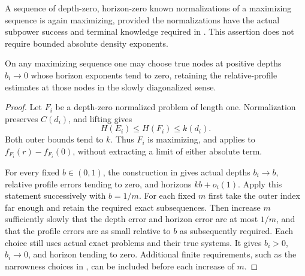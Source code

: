 \begin{corollary}
\label{a03:zero-depth}
A sequence of depth-zero, horizon-zero known normalizations of a
maximizing sequence is again maximizing, provided the normalizations
have the actual subpower success and terminal knowledge required in
.  This assertion does not require bounded
absolute density exponents.

On any maximizing sequence one may choose true nodes at positive depths
\(b_i\to0\) whose horizon exponents tend to zero, retaining the
relative-profile estimates at those nodes in the slowly diagonalized
sense.
\end{corollary}
\begin{proof}
Let \(F_i\) be a depth-zero normalized problem of length one.
Normalization preserves \(C(d_i)\), and lifting gives
\begin{equation}
H(E_i)\le H(F_i)\le k(d_i).
\end{equation}
Both outer bounds tend to \(k\).  Thus \(F_i\) is maximizing, and
 applies to \(f_{F_i}(r)-f_{F_i}(0)\), without
extracting a limit of either absolute term.

For every fixed \(b\in(0,1)\), the construction in
 gives actual depths \(b_i\to b\), relative
profile errors tending to zero, and horizons \(kb+o_i(1)\).
Apply this statement successively with \(b=1/m\).  For each fixed \(m\)
first take the outer index far enough and retain the required exact
subsequences.  Then increase \(m\) sufficiently slowly that the depth
error and horizon error are at most \(1/m\), and that the profile errors
are as small relative to \(b\) as subsequently required.  Each choice
still uses actual exact problems and their true systems.  It gives
\(b_i>0\), \(b_i\to0\), and horizon tending to zero.  Additional finite
requirements, such as the narrowness choices in
, can be included before each increase of \(m\).
\end{proof}

